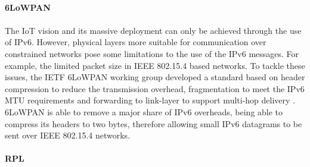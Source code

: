 \paragraph{\textbf{6LoWPAN}}
\paragraph{}
	The \gls{IoT} vision and its massive deployment can only be achieved through the use of IPv6. However, physical layers more suitable for communication over constrained networks pose some limitations to the use of the IPv6 messages. For example, the limited packet size in IEEE 802.15.4 based networks. To tackle these issues, the \gls{IETF} \gls{6LoWPAN} \cite{Shelby2012} working group developed a standard based on header compression to reduce the transmission overhead, fragmentation to meet the IPv6 \gls{MTU} requirements and forwarding to link-layer to support multi-hop delivery \cite{Hui2008}.
	\gls{6LoWPAN} is able to remove a major share of IPv6 overheads, being able to compress its headers to two bytes, therefore allowing small IPv6 datagrams to be sent over IEEE 802.15.4 networks. 
	
\paragraph{\textbf{RPL}}
